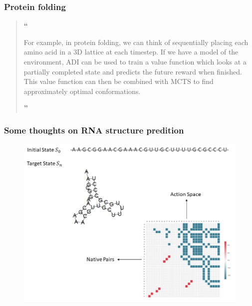 \documentclass[notheorems, aspectratio=54]{beamer}
\begin{document}
\begin{frame}
    \frametitle{Protein folding}

    \begin{quotation}
    \noindent \huge \textbf{``}

    \normalsize For example, in protein folding, we can think of sequentially placing each amino acid in a 3D lattice at each timestep. If we have a model of the environment, ADI can be used to train a value function which looks at a partially completed state and predicts the future reward when finished. This value function can then be combined with MCTS to find approximately optimal conformations.

    \noindent \hspace{24em} \huge \textbf{''}
    \end{quotation}
\end{frame}

\begin{frame}
    \frametitle{Some thoughts on RNA structure predition}

    \begin{figure}
        \includegraphics[height=0.85\textheight]{fig/rna_folding1.png}
    \end{figure}
\end{frame}
\end{document}
